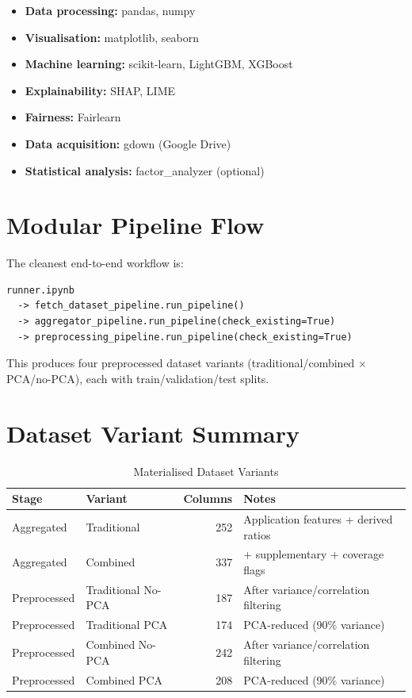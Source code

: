 \begin{itemize}[nosep]
    \item \textbf{Data processing:} pandas, numpy
    \item \textbf{Visualisation:} matplotlib, seaborn
    \item \textbf{Machine learning:} scikit-learn, LightGBM, XGBoost
    \item \textbf{Explainability:} SHAP, LIME
    \item \textbf{Fairness:} Fairlearn
    \item \textbf{Data acquisition:} gdown (Google Drive)
    \item \textbf{Statistical analysis:} factor\_analyzer (optional)
\end{itemize}

\section{Modular Pipeline Flow}

The cleanest end-to-end workflow is:

\begin{verbatim}
runner.ipynb
  -> fetch_dataset_pipeline.run_pipeline()
  -> aggregator_pipeline.run_pipeline(check_existing=True)
  -> preprocessing_pipeline.run_pipeline(check_existing=True)
\end{verbatim}

This produces four preprocessed dataset variants (traditional/combined $\times$ PCA/no-PCA), each with train/validation/test splits.

\section{Dataset Variant Summary}

\begin{table}[H]
\centering
\caption{Materialised Dataset Variants}
\label{tab:dataset_variants_appendix}
\begin{tabular}{llrl}
\toprule
\textbf{Stage} & \textbf{Variant} & \textbf{Columns} & \textbf{Notes} \\
\midrule
Aggregated & Traditional & 252 & Application features + derived ratios \\
Aggregated & Combined & 337 & + supplementary + coverage flags \\
Preprocessed & Traditional No-PCA & 187 & After variance/correlation filtering \\
Preprocessed & Traditional PCA & 174 & PCA-reduced (90\% variance) \\
Preprocessed & Combined No-PCA & 242 & After variance/correlation filtering \\
Preprocessed & Combined PCA & 208 & PCA-reduced (90\% variance) \\
\bottomrule
\end{tabular}
\end{table}
